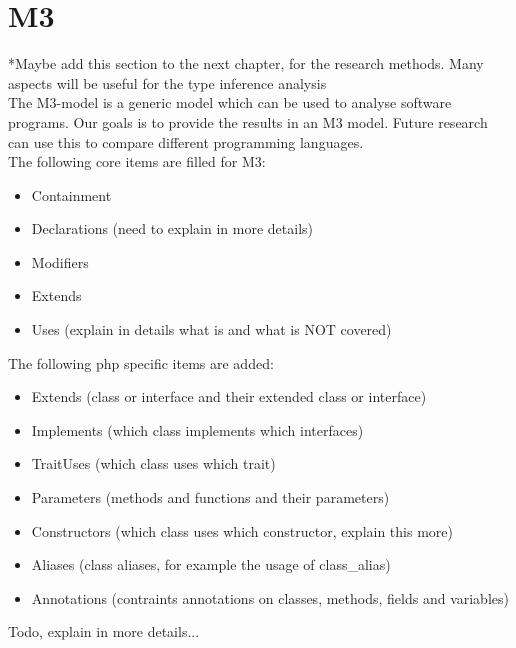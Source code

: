 \documentclass[../main.tex]{subfiles}
\begin{document}
    \section{M3}
    \footnotesize{*Maybe add this section to the next chapter, for the research methods. Many aspects will be useful for the type inference analysis}
    \\
    The M3-model is a generic model which can be used to analyse software programs.
    Our goals is to provide the results in an M3 model.
    Future research can use this to compare different programming languages.
    \\ 
    The following core items are filled for M3:
    \begin{itemize}
        \item Containment
        \item Declarations (need to explain in more details)
        \item Modifiers
        \item Extends
        \item Uses (explain in details what is and what is NOT covered)
    \end{itemize}
    
    The following php specific items are added:
    \begin{itemize}
        \item Extends (class or interface and their extended class or interface)
        \item Implements (which class implements which interfaces)
        \item TraitUses (which class uses which trait)
        \item Parameters (methods and functions and their parameters)
        \item Constructors (which class uses which constructor, explain this more)
        \item Aliases (class aliases, for example the usage of class\_{}alias)
        \item Annotations (contraints annotations on classes, methods, fields and variables)
    \end{itemize}
    Todo, explain in more details...

    
\end{document}
